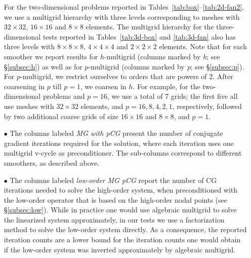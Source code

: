 \documentclass[times]{nlaauth}
\begin{document}
\begin{itemize}
    For the two-dimensional problems reported in
    Tables~\ref{tab:box}--\ref{tab:2d-fan2}, we use a multigrid
    hierarchy with three levels corresponding to meshes with
    $32\times32$, $16\times16$ and $8\times8$ elements.
    The multigrid hierarchy for the three-dimensional
    tests reported in Tables~\ref{tab:3d-box} and \ref{tab:3d-fan}
    also has three levels with
    $8\times8\times8$, $4\times4\times4$ and $2\times2\times2$
    elements.  Note that for each smoother we report results
    for $h$-multigrid (columns marked by \emph{h}; see
    \S\ref{subsec:h}) as well as for $p$-multigrid (columns marked by
    \emph{p}; see \S\ref{subsec:p}). For $p$-multigrid, we restrict
    ourselves to orders that are powers of 2. After coarsening in $p$
    till $p=1$, we coarsen in $h$. For example, for the
    two-dimensional problems and $p=16$, we use a total of 7 grids;
    the first five all use meshes with $32\times32$ elements,
    and $p=16,8,4,2,1$, respectively, followed by two additional
    coarse grids of size $16\times16$ and $8\times8$, and
    $p=1$.
\item[$\bullet$] The columns labeled \emph{MG with pCG} present the
  number of conjugate gradient iterations required for the solution,
  where each iteration uses one multigrid v-cycle as preconditioner.
  The sub-columns correspond to different smoothers, as described
  above.
\item[$\bullet$] The columns labeled \emph{low-order MG pCG} report
  the number of CG iterations needed to solve the high-order system,
  when preconditioned with the low-order operator that is based on the
  high-order nodal points (see \S\ref{subsec:low}).  While in practice
  one would use algebraic multigrid to solve the linearized system
  approximately, in our tests we use a factorization method to solve
  the low-order system directly.  As a consequence, the reported
  iteration counts are a lower bound for the iteration counts one
  would obtain if the low-order system was inverted approximately by
  algebraic multigrid.


\end{itemize}
\end{document}
